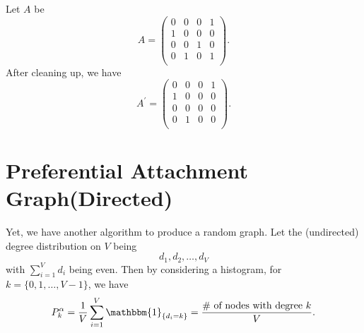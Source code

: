 \begin{remark}
\begin{itemize}
		      \begin{eg}
			      Let \(A\) be
			      \[
				      A = \begin{pmatrix}
					      0 & 0 & 0 & 1 \\
					      1 & 0 & 0 & 0 \\
					      0 & 0 & 1 & 0 \\
					      0 & 1 & 0 & 1 \\
				      \end{pmatrix}.
			      \]
			      After cleaning up, we have
			      \[
				      A^\prime = \begin{pmatrix}
					      0 & 0 & 0 & 1 \\
					      1 & 0 & 0 & 0 \\
					      0 & 0 & 0 & 0 \\
					      0 & 1 & 0 & 0 \\
				      \end{pmatrix}.
			      \]
		      \end{eg}
	\end{itemize}
\end{remark}

\section{Preferential Attachment Graph(Directed)}
Yet, we have another algorithm to produce a random graph. Let the (undirected) degree distribution on \(V\) being
\[
	d_1, d_2, \ldots , d_V
\]
with \(\sum\limits_{i=1}^{V} d_i\) being even. Then by considering a histogram, for \(k = \{0, 1, \ldots , V - 1\}\), we have
\[
	P_k^{\alpha} = \frac{1}{V}\sum\limits_{i=1}^{V} \mathbbm{1}_{\{d_i = k\}} = \frac{\#\text{ of nodes with degree }k}{V}.
\]

